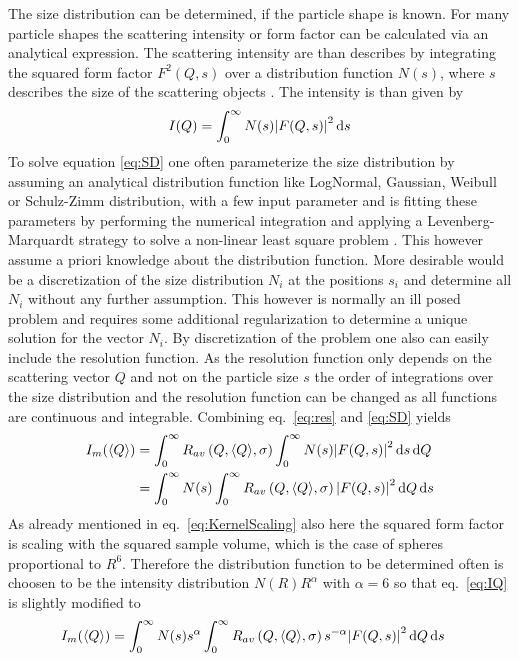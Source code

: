 The size distribution can be determined, if the particle shape is known. For many particle shapes the scattering intensity or form factor can be calculated via an analytical expression. The scattering intensity are than describes by integrating the squared form factor $F^2(Q,s)$ over a distribution function $N(s)$, where $s$ describes the size of the scattering objects \cite{Pedersen1997}. The intensity is than given by
\begin{equation} \label{eq:SD}
I(Q) = \int_0^\infty N(s) \abs{F(Q,s)}^2 \, \mathrm{d}s
\end{equation}
To solve equation \ref{eq:SD} one often parameterize the size distribution by assuming an analytical distribution function like LogNormal, Gaussian, Weibull or Schulz-Zimm distribution, with a few input parameter and is fitting these parameters by performing the numerical integration and applying a Levenberg-Marquardt strategy to solve a non-linear least square problem \cite{Bressler2015}. This however assume a priori knowledge about the distribution function. More desirable would be a discretization of the size distribution $N_i$ at the positions $s_i$ and determine all $N_i$ without any further assumption. This however is normally an ill posed problem and requires some additional regularization to determine a unique solution for the vector $N_i$. By discretization of the problem one also can easily include the resolution function. As the resolution function only depends on the scattering vector $Q$ and not on the particle size $s$ the order of integrations over the size distribution and the resolution function can be changed as all functions are continuous and integrable. Combining eq.\ \ref{eq:res} and \ref{eq:SD} yields
\begin{align}
I_m(\langle Q\rangle) &= \int_0^\infty R_{av}\left(Q,\langle
Q\rangle,\sigma\right)  \int_0^\infty N(s) \abs{F(Q,s)}^2 \, \mathrm{d}s \, \mathrm{d}Q \\
&= \int_0^\infty N(s)  \int_0^\infty R_{av}\left(Q,\langle
Q\rangle,\sigma\right) \abs{F(Q,s)}^2 \, \mathrm{d}Q \, \mathrm{d}s \label{eq:IQ}
\end{align}
As already mentioned in eq.\ \ref{eq:KernelScaling} also here the squared form factor is scaling with the squared sample volume, which is the case of spheres proportional to $R^6$. Therefore the distribution function to be determined often is choosen to be the intensity distribution $N(R)R^\alpha$ with $\alpha=6$ so that eq.\ \ref{eq:IQ} is slightly modified to
\begin{align}
I_m(\langle Q\rangle) &=  \int_0^\infty N(s)s^\alpha  \int_0^\infty R_{av}\left(Q,\langle
Q\rangle,\sigma\right) s^{-\alpha}\abs{F(Q,s)}^2 \, \mathrm{d}Q \, \mathrm{d}s
\end{align}
